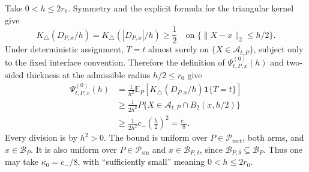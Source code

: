 Take \(0<h\leq2r_0\).  Symmetry and the explicit formula for the triangular kernel give
\[
 K_\triangle(D_{P,x}/h)=K_\triangle(|D_{P,x}|/h)\geq\frac12
 \quad\text{on }\{\lVert X-x\rVert_2\leq h/2\}.
\]
Under deterministic assignment, \(T=t\) almost surely on \(\{X\in\mathcal A_{t,P}\}\), subject only to the fixed interface convention.  Therefore the definition of \(\Psi^{(0)}_{t,P,x}(h)\) and two-sided thickness at the admissible radius \(h/2\leq r_0\) give
\[
\begin{aligned}
 \Psi^{(0)}_{t,P,x}(h)
 &=\frac1{h^2}\mathbb E_P\!\left[K_\triangle(D_{P,x}/h)\mathbf1\{T=t\}\right]\\
 &\geq\frac1{2h^2}P\{X\in\mathcal A_{t,P}\cap B_2(x,h/2)\}\\
 &\geq\frac1{2h^2}c_-\left(\frac h2\right)^2
 =\frac{c_-}{8}.
\end{aligned}
\]
Every division is by \(h^2>0\).  The bound is uniform over \(P\in\mathcal P_{\mathrm{rect}}\), both arms, and \(x\in\mathcal B_P\).  It is also uniform over \(P\in\mathcal P_{\mathrm{sm}}\) and \(x\in\mathcal B_{P,\delta}\), since \(\mathcal B_{P,\delta}\subseteq\mathcal B_P\).  Thus one may take \(\kappa_0=c_-/8\), with ``sufficiently small'' meaning \(0<h\leq2r_0\).